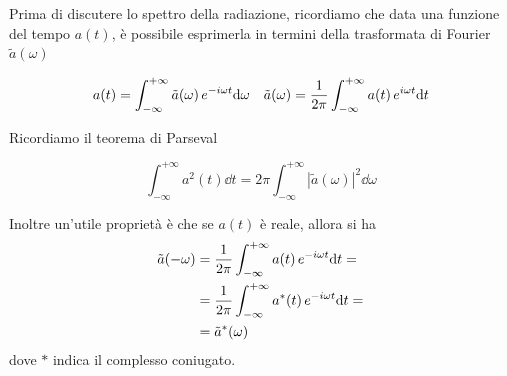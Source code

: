 
Prima di discutere lo spettro della radiazione, ricordiamo che data una funzione del tempo $a(t)$, è possibile esprimerla in termini della trasformata di Fourier $\tilde{a}(\omega)$
\begin{EQ}
\begin{align}
&a(t) = \int_{-\infty}^{+\infty}\tilde{a}(\omega)\,e^{-i\omega t} \mathrm{d}\omega
&\tilde{a}(\omega) = \dfrac{1}{2\pi}\int_{-\infty}^{+\infty}a(t)\,e^{i\omega t} \mathrm{d} t
\end{align}
\end{EQ}
Ricordiamo il teorema di Parseval
\begin{EQ}
\begin{equation}
\int_{-\infty}^{+\infty} a^2(t) \dd t = 2 \pi \int_{-\infty}^{+\infty} |\tilde{a}(\omega)|^2 \dd \omega
\end{equation}
\end{EQ}
Inoltre un'utile proprietà è che se $a(t)$ è reale, allora si ha
\begin{align}
\tilde{a}(-\omega) &= \dfrac{1}{2\pi} \int_{-\infty}^{+\infty} a(t)\, e^{-i\omega t} \mathrm{d} t = \\
&=\dfrac{1}{2\pi} \int_{-\infty}^{+\infty} a^*(t)\, e^{-i\omega t} \mathrm{d} t = \\
&= \tilde{a}^{*}(\omega) \label{eq:Spettro1}
\end{align}
dove $*$ indica il complesso coniugato. 

